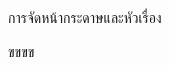 \documentclass[10pt,twoside]{book}
\begin{document}
    \frontmatter
การจัดหน้ากระดาษและหัวเรื่อง

    \mainmatter
    \pagestyle{fancy}
ขขขข
\end{document}
